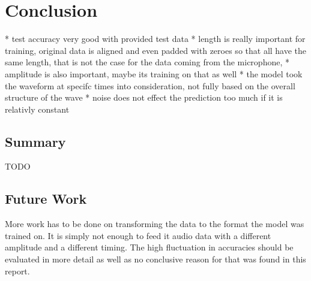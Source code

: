 \chapter{Conclusion}
* test accuracy very good with provided test data
* length is really important for training, original data is aligned and even padded with zeroes so that all have the same length,
that is not the case for the data coming from the microphone, 
* amplitude is also important, maybe its training on that as well
* the model took the waveform at specifc times into consideration, not fully based on the overall structure of the wave
* noise does not effect the prediction too much if it is relativly constant

\section{Summary}
TODO

\section{Future Work}
More work has to be done on transforming the data to the format the model was trained on. It is simply not enough to feed it audio data with
a different amplitude and a different timing. The high fluctuation in accuracies should be evaluated in more detail as well as no conclusive reason for that
was found in this report.